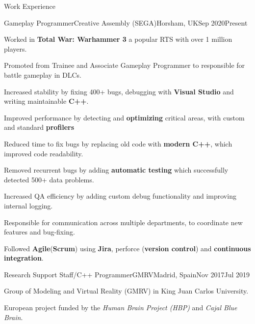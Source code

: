\documentclass{resume} %
\begin{document}
\begin{mainSection}{Work Experience}
\begin{multiWorkExperience}
{Gameplay Programmer}{Creative Assembly (SEGA)}{Horsham, UK}{Sep 2020}{Present}
\item Worked in \textbf{Total War: Warhammer 3} a popular RTS with over 1 million players.

\item Promoted from Trainee and Associate Gameplay Programmer to responsible for battle gameplay in DLCs.

\item Increased stability by fixing 400+ bugs, debugging with \textbf{Visual Studio} and writing maintainable \textbf{C++}.

\item Improved performance by detecting and \textbf{optimizing} critical areas, with custom and standard \textbf{profilers}

\item Reduced time to fix bugs by replacing old code with \textbf{modern C++}, which improved code readability.

\item Removed recurrent bugs by adding \textbf{automatic testing} which successfully detected 500+ data problems.

\item Increased QA efficiency by adding custom debug functionality and improving internal logging.

\item Responsible for communication across multiple departments, to coordinate new features and bug-fixing.

\item Followed \textbf{Agile}(\textbf{Scrum}) using \textbf{Jira}, perforce (\textbf{version control}) and \textbf{continuous integration}.
\end{multiWorkExperience}
\begin{multiWorkExperience}
{Research Support Staff/C++ Programmer}{GMRV}{Madrid, Spain}{Nov 2017}{Jul 2019}

\item Group of Modeling and Virtual Reality (GMRV) in King Juan Carlos University.

\item European project funded by the \textit{Human Brain Project (HBP)} and \textit{Cajal Blue Brain}.


\end{multiWorkExperience}
\end{mainSection}
\end{document}
